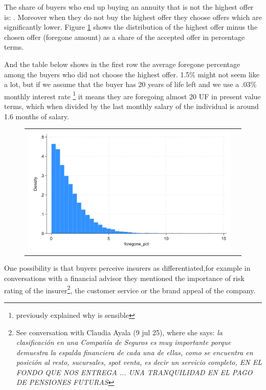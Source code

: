 \documentclass[12pt]{article}
\begin{document}
The share of buyers who end up buying an annuity that is not the highest offer is: . Moreover when they do not buy the highest offer they choose offers which are significantly lower. Figure \ref{fig:ie3_7} shows the distribution of the highest offer minus the chosen offer (foregone amount) as a share of the accepted offer in percentage terms. 

And the table below shows in the first row the average foregone percentage among the buyers who did not choose the highest offer. 1.5\% might not seem like a lot, but if we assume that the buyer has 20 years of life left and we use a .03\% monthly interest rate  \footnote{previously explained why is sensible} it means they are foregoing almost 20 UF in present value terms, which when divided by the last monthly salary of the individual is around 1.6 months of salary. 


\begin{figure}[H]
\caption{}
\label{fig:ie3_7}
\centering{}%
\begin{tabular}{cc}
\includegraphics[scale=0.27]{figures/IE3_foregone_hist.png}
\end{tabular}
\end{figure}



One possibility is that buyers perceive insurers as differentiated,for example in conversations with a financial advisor they mentioned the importance of risk rating of the insurer\footnote{See conversation with Claudia Ayala (9 jul 25), where she says: \textit{ la clasificación en una Compañía de Seguros es muy importante porque demuestra la espalda financiera de cada una de ellas, como se encuentra en posición al resto, sucursales, spot venta, es decir un servicio completo, EN EL FONDO QUE NOS ENTREGA ... UNA TRANQUILIDAD EN EL PAGO DE PENSIONES FUTURAS}}, the customer service or the brand appeal of the company. 
\end{document}
